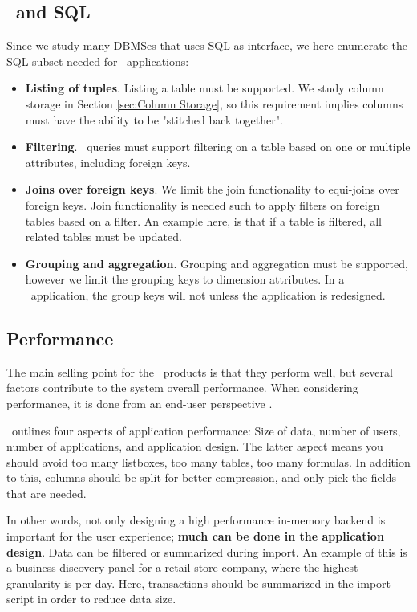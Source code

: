 \subsection{\bd~and SQL}
\label{sub:Business Discovery and SQL}
Since we study many DBMSes that uses SQL as interface, we here enumerate the SQL subset needed for \bd~applications:
\begin{itemize}
  \item \textbf{Listing of tuples}. Listing a table must be supported. We study column storage in Section \ref{sec:Column Storage}, so this requirement implies columns must have the ability to be "stitched back together".
  \item \textbf{Filtering}. \bd~queries must support filtering on a table based on one or multiple attributes, including foreign keys.
  \item \textbf{Joins over foreign keys}. We limit the join functionality to equi-joins over foreign keys. Join functionality is needed such to apply filters on foreign tables based on a filter. An example here, is that if a table is filtered, all related tables must be updated.
  \item \textbf{Grouping and aggregation}. Grouping and aggregation must be supported, however we limit the grouping keys to dimension attributes. In a \bd~application, the group keys will not unless the application is redesigned.
\end{itemize}

\subsection{Performance}
\label{sub:Performance}
The main selling point for the \bd~products is that they perform well, but several factors contribute to the system overall performance. When considering performance, it is done from an end-user perspective \cite{Qlik2011-yc}.

\qlikview~outlines four aspects of application performance: Size of data, number of users, number of applications, and application design. The latter aspect means you should avoid too many listboxes, too many tables, too many formulas. In addition to this, columns should be split for better compression, and only pick the fields that are needed.

In other words, not only designing a high performance in-memory backend is important for the user experience; \textbf{much can be done in the application design}. Data can be filtered or summarized during import. An example of this is a business discovery panel for a retail store company, where the highest granularity is per day. Here, transactions should be summarized in the import script in order to reduce data size.
